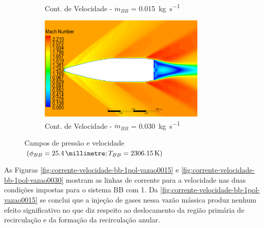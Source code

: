 \begin{figure}[!ht]
\begin{subfigure}[b]{0.47\textwidth}
        \caption{Cont. de Velocidade - \(\Dot{m}_{BB}\) = \qty{0,015}{\kilogram\per\second}}
        \label{fig:contorno-velocidade-bb-1pol-vazao0015}
    \end{subfigure}
    \hfill
	\begin{subfigure}[b]{0.47\textwidth} %
        \centering
        \includegraphics[height=5cm,width=\textwidth]{contorno-velocidade-2306K-vazao-0030-1pol.png}
        \caption{Cont. de Velocidade - \(\Dot{m}_{BB}\) = \qty{0,030}{\kilogram\per\second}}
        \label{fig:contorno-velocidade-bb-1pol-vazao0030}
    \end{subfigure}
    \caption{Campos de pressão e velocidade \(\left(\phi_{BB} = \qty{25,4}{\millimetre}; T_{BB} = \qty{2306,15}{\kelvin}\right)\)}
	\label{fig:influencia-diametro-vazao-1pol}
\end{figure}

As Figuras \ref{fig:corrente-velocidade-bb-1pol-vazao0015} e \ref{fig:corrente-velocidade-bb-1pol-vazao0030} mostram as linhas de corrente para a velocidade nas duas condições impostas para o sistema BB com \qty{1}{\polegada}. Da \autoref{fig:corrente-velocidade-bb-1pol-vazao0015} se conclui que a injeção de gases nessa vazão mássica produz nenhum efeito significativo no que diz respeito ao deslocamento da região primária de recirculação e da formação da recirculação anular.

